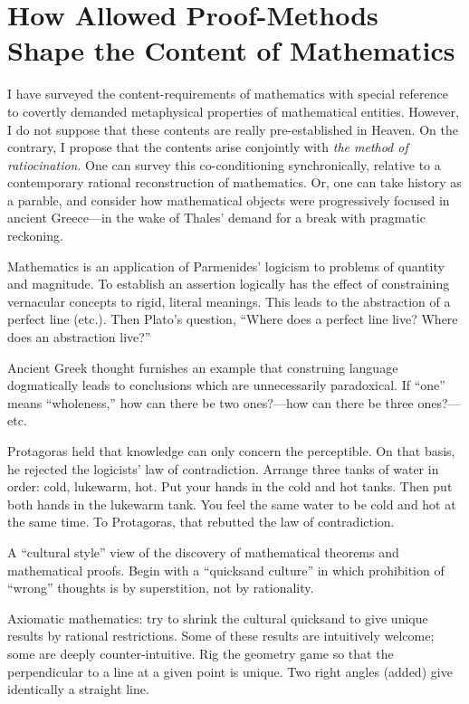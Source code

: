 \jarule

\section{How Allowed Proof-Methods Shape the Content of Mathematics}

I have surveyed the content-requirements of mathematics with special reference to covertly demanded metaphysical properties of mathematical entities. However, I do not suppose that these contents are really pre-established in Heaven. On the contrary, I propose that the contents arise conjointly with \textit{the method of ratiocination}. One can survey this co-conditioning synchronically, relative to a contemporary rational reconstruction of mathematics. Or, one can take history as a parable, and consider how mathematical objects were progressively focused in ancient Greece---in the wake of Thales' demand for a break with pragmatic reckoning.

Mathematics is an application of Parmenides' logicism to problems of quantity and magnitude. To establish an assertion logically has the effect of constraining vernacular concepts to rigid, literal meanings. This leads to the abstraction of a perfect line (etc.). Then Plato's question, \enquote{Where does a perfect line live? Where does an abstraction live?}

Ancient Greek thought furnishes an example that construing language dogmatically leads to conclusions which are unnecessarily paradoxical. If \enquote{one} means \enquote{wholeness,} how can there be two ones?---how can there be three ones?---etc.

Protagoras held that knowledge can only concern the perceptible. On that basis, he rejected the logicists' law of contradiction. Arrange three tanks of water in order: cold, lukewarm, hot. Put your hands in the cold and hot tanks. Then put both hands in the lukewarm tank. You feel the same water to be cold and hot at the same time. To Protagoras, that rebutted the law of contradiction.

A \enquote{cultural style} view of the discovery of mathematical theorems and mathematical proofs. Begin with a \enquote{quicksand culture} in which prohibition of \enquote{wrong} thoughts is by superstition, not by rationality.

Axiomatic mathematics: try to shrink the cultural quicksand to give unique results by rational restrictions. Some of these results are intuitively welcome; some are deeply counter-intuitive. Rig the geometry game so that the perpendicular to a line at a given point is unique. Two right angles (added) give identically a straight line.

